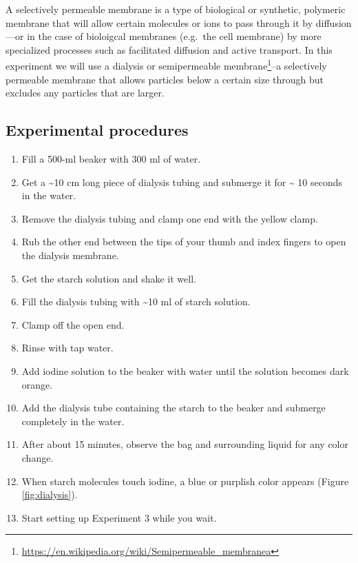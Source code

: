\documentclass[]{book}
\providecommand{\tightlist}{%
  \setlength{\itemsep}{0pt}\setlength{\parskip}{0pt}}
\let\rmarkdownfootnote\footnote%
\def\footnote{\protect\rmarkdownfootnote}
\renewcommand{\href}[2]{#2\footnote{\url{#1}}}
\begin{document}
A selectively permeable membrane is a type of biological or synthetic, polymeric membrane that will allow certain molecules or ions to pass through it by diffusion---or in the case of bioloigcal membranes (e.g.~the cell membrane) by more specialized processes such as facilitated diffusion and active transport. In this experiment we will use a dialysis or \href{https://en.wikipedia.org/wiki/Semipermeable_membranea}{semipermeable membrane}--a selectively permeable membrane that allows particles below a certain size through but excludes any particles that are larger.

\hypertarget{experimental-procedures-16}{%
\subsection{Experimental procedures}\label{experimental-procedures-16}}

\begin{enumerate}
\def\labelenumi{\arabic{enumi}.}
\tightlist
\item
  Fill a 500-ml beaker with 300 ml of water.
\item
  Get a \textasciitilde{}10 cm long piece of dialysis tubing and submerge it for \textasciitilde{} 10 seconds in the water.
\item
  Remove the dialysis tubing and clamp one end with the yellow clamp.
\item
  Rub the other end between the tips of your thumb and index fingers to open the dialysis membrane.
\item
  Get the starch solution and shake it well.
\item
  Fill the dialysis tubing with \textasciitilde{}10 ml of starch solution.
\item
  Clamp off the open end.
\item
  Rinse with tap water.
\item
  Add iodine solution to the beaker with water until the solution becomes dark orange.
\item
  Add the dialysis tube containing the starch to the beaker and submerge completely in the water.
\item
  After about 15 minutes, observe the bag and surrounding liquid for any color change.
\item
  When starch molecules touch iodine, a blue or purplish color appears (Figure \ref{fig:dialysis}).
\item
  Start setting up Experiment 3 while you wait.
\end{enumerate}
\end{document}
